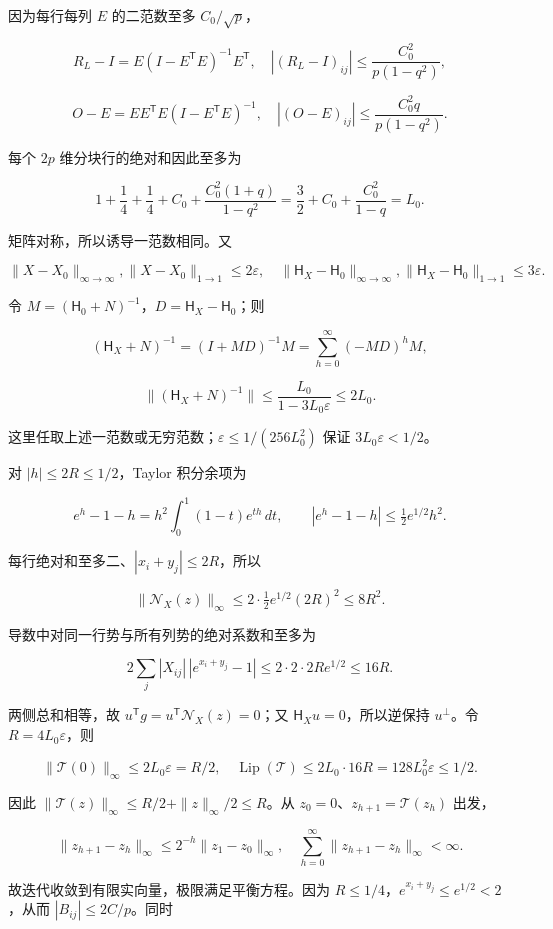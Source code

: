 \documentclass[11pt,a4paper]{article}
\begin{document}
因为每行每列 \(E\) 的二范数至多 \(C_0/\sqrt p\)，

\[R_L-I=E(I-E^{\mathsf T}E)^{-1}E^{\mathsf T},
\quad |(R_L-I)_{ij}|\le\frac{C_0^2}{p(1-q^2)},\]

\[O-E=EE^{\mathsf T}E(I-E^{\mathsf T}E)^{-1},
\quad |(O-E)_{ij}|\le\frac{C_0^2q}{p(1-q^2)}.\]

每个 \(2p\) 维分块行的绝对和因此至多为

\[1+\frac14+\frac14+C_0+
\frac{C_0^2(1+q)}{1-q^2}
=\frac32+C_0+\frac{C_0^2}{1-q}=L_0.\]

矩阵对称，所以诱导一范数相同。又

\[\|X-X_0\|_{\infty\to\infty},\|X-X_0\|_{1\to1}\le2\varepsilon,
\quad\|\mathsf H_X-\mathsf H_0\|_{\infty\to\infty},
\|\mathsf H_X-\mathsf H_0\|_{1\to1}\le3\varepsilon.\]

令 \(M=(\mathsf H_0+N)^{-1}\)，\(D=\mathsf H_X-\mathsf H_0\)；则

\[(\mathsf H_X+N)^{-1}=(I+MD)^{-1}M
=\sum_{h=0}^{\infty}(-MD)^hM,\]

\[\|(\mathsf H_X+N)^{-1}\|\le\frac{L_0}{1-3L_0\varepsilon}\le2L_0.\]

这里任取上述一范数或无穷范数；\(\varepsilon\le1/(256L_0^2)\) 保证 \(3L_0\varepsilon<1/2\)。

对 \(|h|\le2R\le1/2\)，Taylor 积分余项为

\[e^h-1-h=h^2\int_0^1(1-t)e^{th}\,dt,
\qquad |e^h-1-h|\le\tfrac12e^{1/2}h^2.\]

每行绝对和至多二、\(|x_i+y_j|\le2R\)，所以

\[\|\mathcal N_X(z)\|_\infty\le2\cdot\tfrac12e^{1/2}(2R)^2\le8R^2.\]

导数中对同一行势与所有列势的绝对系数和至多为

\[2\sum_j|X_{ij}|\,|e^{x_i+y_j}-1|
\le2\cdot2\cdot2Re^{1/2}\le16R.\]

两侧总和相等，故 \(u^{\mathsf T}g=u^{\mathsf T}\mathcal N_X(z)=0\)；又 \(\mathsf H_Xu=0\)，所以逆保持 \(u^\perp\)。令 \(R=4L_0\varepsilon\)，则

\[\|\mathcal T(0)\|_\infty\le2L_0\varepsilon=R/2,
\quad\operatorname{Lip}(\mathcal T)\le2L_0\cdot16R
=128L_0^2\varepsilon\le1/2.\]

因此 \(\|\mathcal T(z)\|_\infty\le R/2+\|z\|_\infty/2\le R\)。从 \(z_0=0\)、\(z_{h+1}=\mathcal T(z_h)\) 出发，

\[\|z_{h+1}-z_h\|_\infty\le2^{-h}\|z_1-z_0\|_\infty,
\quad\sum_{h=0}^{\infty}\|z_{h+1}-z_h\|_\infty<\infty.\]

故迭代收敛到有限实向量，极限满足平衡方程。因为 \(R\le1/4\)，\(e^{x_i+y_j}\le e^{1/2}<2\)，从而 \(|B_{ij}|\le2C/p\)。同时
\end{document}
